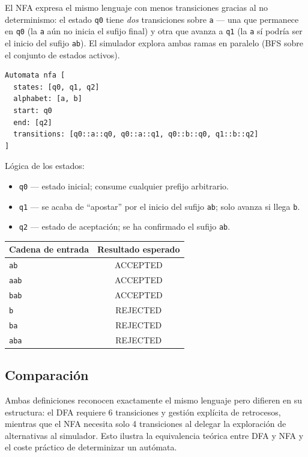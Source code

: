 \documentclass{article}
\begin{document}
El NFA expresa el mismo lenguaje con menos transiciones gracias al no determinismo:
el estado \texttt{q0} tiene \emph{dos} transiciones sobre \texttt{a} — una que permanece
en \texttt{q0} (la \texttt{a} aún no inicia el sufijo final) y otra que avanza a
\texttt{q1} (la \texttt{a} sí podría ser el inicio del sufijo \texttt{ab}).
El simulador explora ambas ramas en paralelo (BFS sobre el conjunto de estados activos).

\begin{verbatim}
Automata nfa [
  states: [q0, q1, q2]
  alphabet: [a, b]
  start: q0
  end: [q2]
  transitions: [q0::a::q0, q0::a::q1, q0::b::q0, q1::b::q2]
]
\end{verbatim}

\noindent Lógica de los estados:
\begin{itemize}
  \item \texttt{q0} — estado inicial; consume cualquier prefijo arbitrario.
  \item \texttt{q1} — se acaba de ``apostar'' por el inicio del sufijo \texttt{ab};
        solo avanza si llega \texttt{b}.
  \item \texttt{q2} — estado de aceptación; se ha confirmado el sufijo \texttt{ab}.
\end{itemize}

\begin{center}
\begin{tabular}{|l|c|}
\hline
\textbf{Cadena de entrada} & \textbf{Resultado esperado} \\
\hline
\texttt{ab}   & ACCEPTED \\
\texttt{aab}  & ACCEPTED \\
\texttt{bab}  & ACCEPTED \\
\texttt{b}    & REJECTED \\
\texttt{ba}   & REJECTED \\
\texttt{aba}  & REJECTED \\
\hline
\end{tabular}
\end{center}

\subsection{Comparación}

Ambas definiciones reconocen exactamente el mismo lenguaje pero difieren en su
estructura: el DFA requiere 6 transiciones y gestión explícita de retrocesos,
mientras que el NFA necesita solo 4 transiciones al delegar la exploración de
alternativas al simulador.
Esto ilustra la equivalencia teórica entre DFA y NFA y el coste práctico
de determinizar un autómata.
\end{document}
